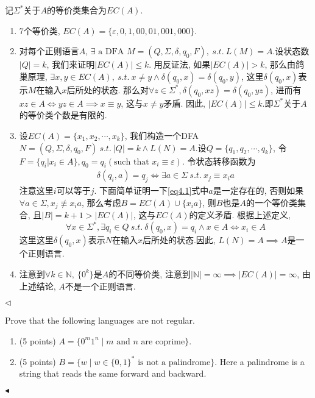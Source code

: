 \documentclass[11pt]{article}
\newenvironment{problem}[2][Problem]{\begin{trivlist}
\item[\hskip \labelsep{\bfseries#1}\hskip\labelsep{\bfseries#2.}]}{\hfill$\blacktriangleleft$\end{trivlist}}
\newenvironment{answer}[1][Answer]{\begin{trivlist}
\item[\hskip \labelsep{\bfseries\itshape#1.}\hskip \labelsep]}{\hfill$\lhd$\end{trivlist}}
\begin{document}
\begin{answer}
    记$\Sigma^*$关于$A$的等价类集合为$EC(A)$.
    \begin{enumerate}[label = (\alph*)]
        \item 7个等价类, $EC(A) = \{\varepsilon, 0, 1, 00, 01, 001, 000\}$.
        \item 对每个正则语言$A$, $\exists \text{ a DFA } M = (Q, \Sigma, \delta, q_0, F), ~s.t.~ L(M)=A$.设状态数$|Q| = k$, 我们来证明$\left\vert EC(A) \right\vert \le k$. 
        用反证法, 如果$\left\vert EC(A) \right\vert > k$, 那么由鸽巢原理, $\exists x, y \in EC(A), ~s.t.~ x \neq y \land \delta(q_0, x) = \delta(q_0, y)$, 这里$\delta(q_0, x)$表示$M$在输入$x$后所处的状态.
        那么对$\forall z \in \Sigma^*, \delta(q_0, xz) = \delta(q_0, yz)$, 进而有$xz \in A \Leftrightarrow yz \in A \implies x \equiv y$, 这与$x \neq y$矛盾. 因此, $\left\vert EC(A) \right\vert \le k$.即$\Sigma^*$关于$A$的等价类个数是有限的.
        \item 设$EC(A) = \{x_1, x_2, \cdots, x_k\}$, 我们构造一个DFA $N = (Q, \Sigma, \delta, q_0, F) ~s.t.~ |Q| = k \land L(N) = A$.设$Q = \{q_1, q_2, \cdots, q_k\}$, 令$F = \{q_i | x_i \in A\}, q_0 = q_i(\text{such that }x_i \equiv \varepsilon)$. 令状态转移函数为
        \begin{align}
            \delta(q_i, a) = q_j \Longleftrightarrow \exists a \in \Sigma ~s.t.~ x_j \equiv x_i a \label{eq4.1}
        \end{align}
        注意这里$i$可以等于$j$. 下面简单证明一下\eqref{eq4.1}式中$a$是一定存在的, 否则如果$\forall a \in \Sigma, x_j \not\equiv x_i a$, 那么考虑$B = EC(A) \cup \{x_i a\}$, 则$B$也是$A$的一个等价类集合, 且$|B| = k+1 > |EC(A)|$, 这与$EC(A)$的定义矛盾. 
        根据上述定义, \[ 
            \forall x \in \Sigma^*, \exists q_i \in Q ~s.t.~ \delta(q_0, x) = q_i \land x \in A \Longleftrightarrow x_i \in A 
            \]
        这里这里$\delta(q_0, x)$表示$N$在输入$x$后所处的状态.因此, $L(N) = A \implies A$是一个正则语言.
        \item 注意到$\forall k \in \mathbb{N}, ~\{0^k\}$是$A$的不同等价类, 注意到$|\mathbb{N}| = \infty \implies |EC(A)| = \infty$, 由上述结论, $A$不是一个正则语言.
    \end{enumerate}
\end{answer}
\begin{problem}{5.(10 points)}
    Prove that the following languages are not regular.
\begin{enumerate}[label = (\alph*)]
   \item (5 points) $A = \{0^m1^n\mid m \mbox{ and } n \mbox{ are coprime}\}$.
    \item (5 points) $B = \{w\mid w\in \{0, 1\}^*\mbox{ is not a palindrome}\}$. Here a palindrome is a string that reads the same forward and backward.
\end{enumerate}
\end{problem}
\end{document}
